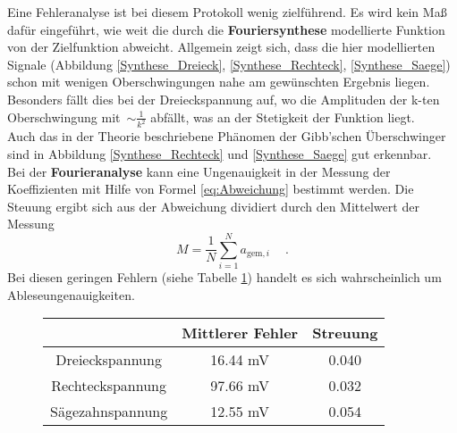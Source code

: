 Eine Fehleranalyse ist bei diesem Protokoll wenig zielführend. Es wird kein Maß dafür eingeführt, wie weit die durch die \textbf{Fouriersynthese} modellierte Funktion von der Zielfunktion abweicht. Allgemein zeigt sich, dass die hier modellierten Signale (Abbildung \ref{Synthese_Dreieck}, \ref{Synthese_Rechteck}, \ref{Synthese_Saege}) schon mit wenigen Oberschwingungen nahe am gewünschten Ergebnis liegen. Besonders fällt dies bei der Dreieckspannung auf, wo die Amplituden der k-ten Oberschwingung mit~$\sim \frac{1}{k^2}$ abfällt, was an der Stetigkeit der Funktion liegt. \\
Auch das in der Theorie beschriebene Phänomen der Gibb'schen Überschwinger sind in Abbildung \ref{Synthese_Rechteck} und \ref{Synthese_Saege} gut erkennbar. \\
Bei der \textbf{Fourieranalyse} kann eine Ungenauigkeit in der Messung der Koeffizienten mit Hilfe von Formel \eqref{eq:Abweichung} bestimmt werden. Die Steuung ergibt sich aus der Abweichung dividiert durch den Mittelwert der Messung
\begin{equation}
M = \frac{1}{N}  \sum_{i=1}^{N}  a_{\text{gem},i}\ \quad.
\end{equation} 
Bei diesen geringen Fehlern (siehe Tabelle \ref{tab:Fehler}) handelt es sich wahrscheinlich um Ableseungenauigkeiten.
\begin{figure}[h!]
	\centering
		\begin{tabular}{c|cc}
			 & Mittlerer Fehler & Streuung \\
			 \hline
			Dreieckspannung & 16.44 \si{\milli\volt} & 0.040 \\
			Rechteckspannung & 97.66 \si{\milli\volt} & 0.032 \\
			Sägezahnspannung & 12.55 \si{\milli\volt} & 0.054 \\
		\end{tabular}
		\label{tab:Fehler}
\end{figure}


